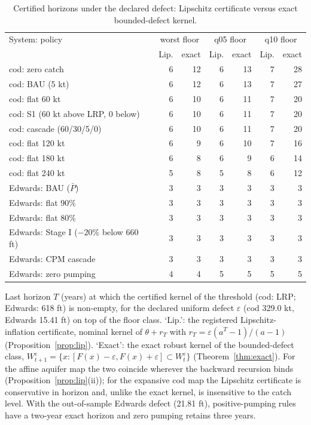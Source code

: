 \documentclass[11pt,a4paper]{article}
\theoremstyle{plain}
\theoremstyle{definition}
\theoremstyle{remark}
\begin{document}
\begin{table}[t]
\centering
\caption{Certified horizons under the declared defect: Lipschitz certificate versus exact bounded-defect kernel.}
\label{tab:horizons}
\small
\begin{tabular}{lrrrrrr}
\toprule
System: policy & \multicolumn{2}{c}{worst floor} & \multicolumn{2}{c}{q05 floor} & \multicolumn{2}{c}{q10 floor} \\ & Lip. & exact & Lip. & exact & Lip. & exact \\
\midrule
cod: zero catch & 6 & 12 & 6 & 13 & 7 & 28 \\
cod: BAU (5 kt) & 6 & 12 & 6 & 13 & 7 & 27 \\
cod: flat 60 kt & 6 & 10 & 6 & 11 & 7 & 20 \\
cod: S1 (60 kt above LRP, 0 below) & 6 & 10 & 6 & 11 & 7 & 20 \\
cod: cascade (60/30/5/0) & 6 & 10 & 6 & 11 & 7 & 20 \\
cod: flat 120 kt & 6 & 9 & 6 & 10 & 7 & 16 \\
cod: flat 180 kt & 6 & 8 & 6 & 9 & 6 & 14 \\
cod: flat 240 kt & 5 & 8 & 5 & 8 & 6 & 12 \\
\midrule
Edwards: BAU ($\bar P$) & 3 & 3 & 3 & 3 & 3 & 3 \\
Edwards: flat 90\% & 3 & 3 & 3 & 3 & 3 & 3 \\
Edwards: flat 80\% & 3 & 3 & 3 & 3 & 3 & 3 \\
Edwards: Stage I ($-20\%$ below 660 ft) & 3 & 3 & 3 & 3 & 3 & 3 \\
Edwards: CPM cascade & 3 & 3 & 3 & 3 & 3 & 3 \\
Edwards: zero pumping & 4 & 4 & 5 & 5 & 5 & 5 \\
\bottomrule
\end{tabular}
\par\smallskip\begin{minipage}{0.97\linewidth}\footnotesize Last horizon $T$ (years) at which the certified kernel of the threshold (cod: LRP; Edwards: 618 ft) is non-empty, for the declared uniform defect $\varepsilon$ (cod 329.0 kt, Edwards 15.41 ft) on top of the floor class. `Lip.': the registered Lipschitz-inflation certificate, nominal kernel of $\theta+r_T$ with $r_T=\varepsilon(a^T-1)/(a-1)$ (Proposition~\ref{prop:lip}). `Exact': the exact robust kernel of the bounded-defect class, $W^\varepsilon_{t+1}=\{x: [F(x)-\varepsilon,F(x)+\varepsilon]\subset W^\varepsilon_t\}$ (Theorem~\ref{thm:exact}). For the affine aquifer map the two coincide wherever the backward recursion binds (Proposition~\ref{prop:lip}(ii)); for the expansive cod map the Lipschitz certificate is conservative in horizon and, unlike the exact kernel, is insensitive to the catch level. With the out-of-sample Edwards defect (21.81 ft), positive-pumping rules have a two-year exact horizon and zero pumping retains three years.\end{minipage}
\end{table}
\end{document}

